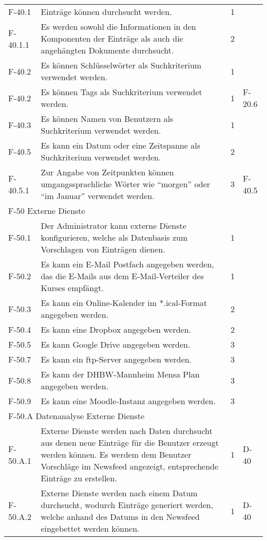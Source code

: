 \begin{tabularx}{\textwidth}{|l|X|l|l|}
    \hline
    F-40.1 & Einträge können durchsucht werden. & 1 &\\
    F-40.1.1 & Es werden sowohl die Informationen in den Komponenten der Einträge als auch die angehängten Dokumente durchsucht. & 2 & \\
    F-40.2 & Es können Schlüsselwörter als Suchkriterium verwendet werden. & 1 &\\
    F-40.2 & Es können Tags als Suchkriterium verwendet werden. & 1 & F-20.6\\
    F-40.3 & Es können Namen von Benutzern als Suchkriterium verwendet werden. & 1 & \\
    F-40.5 & Es kann ein Datum oder eine Zeitspanne als Suchkriterium verwendet werden. & 2 & \\
    F-40.5.1 & Zur Angabe von Zeitpunkten können umgangssprachliche Wörter wie \enquote{morgen} oder \enquote{im Januar} verwendet werden. & 3 & F-40.5\\
    \hline
    \multicolumn{4}{|l|}{F-50 Externe Dienste}\\
    \hline
    F-50.1 & Der Administrator kann externe Dienste konfigurieren, welche als Datenbasis zum Vorschlagen von Einträgen dienen. & 1 & \\
    F-50.2 & Es kann ein E-Mail Postfach angegeben werden, das die E-Mails aus dem E-Mail-Verteiler des Kurses empfängt. & 1 & \\
    F-50.3 & Es kann ein Online-Kalender im *.ical-Format angegeben werden. & 2 & \\
    F-50.4 & Es kann eine Dropbox angegeben werden. & 2 & \\
    F-50.5 & Es kann Google Drive angegeben werden. & 3 & \\
    F-50.7 & Es kann ein ftp-Server angegeben werden. & 3 & \\
    F-50.8 & Es kann der DHBW-Mannheim Mensa Plan angegeben werden. & 3 & \\
    F-50.9 & Es kann eine Moodle-Instanz angegeben werden.&3&\\
    \hline
    \multicolumn{4}{|l|}{F-50.A Datenanalyse Externe Dienste}\\
    \hline
    F-50.A.1 & Externe Dienste werden nach Daten durchsucht aus denen neue Einträge für die Benutzer erzeugt werden können. Es werdem dem Benutzer Vorschläge im Newsfeed angezeigt, entsprechende Einträge zu erstellen. & 1 & D-40\\
    F-50.A.2 & Externe Dienste werden nach einem Datum durchsucht, wodurch Einträge generiert werden, welche anhand des Datums in den Newsfeed eingebettet werden können. & 1 & D-40 \\

\end{tabularx}
